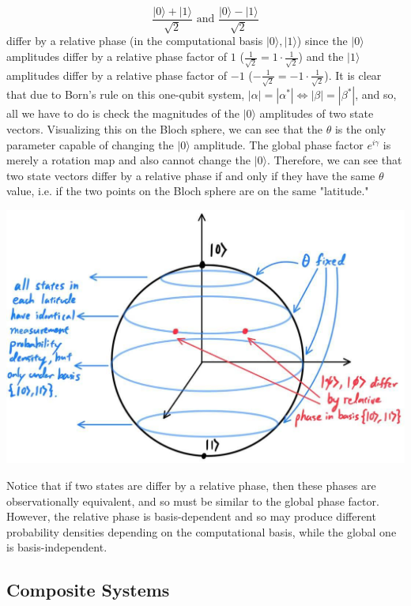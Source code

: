 \documentclass{article}
\begin{document}
    \[\frac{|0\rangle + |1\rangle}{\sqrt{2}} \text{ and } \frac{|0\rangle - |1\rangle}{\sqrt{2}}\]
    differ by a relative phase (in the computational basis $|0\rangle, |1\rangle$) since the $|0\rangle$ amplitudes differ by a relative phase factor of $1$ ($ \frac{1}{\sqrt{2}} = 1 \cdot \frac{1}{\sqrt{2}}$) and the $|1\rangle$ amplitudes differ by a relative phase factor of $-1$ ($-\frac{1}{\sqrt{2}} = -1 \cdot \frac{1}{\sqrt{2}}$). It is clear that due to Born's rule on this one-qubit system, $|\alpha| = |\alpha^*| \iff |\beta| = |\beta^*|$, and so, all we have to do is check the magnitudes of the $|0\rangle$ amplitudes of two state vectors. Visualizing this on the Bloch sphere, we can see that the $\theta$ is the only parameter capable of changing the $|0\rangle$ amplitude. The global phase factor $e^{i\gamma}$ is merely a rotation map and also cannot change the $|0\rangle$. Therefore, we can see that two state vectors differ by a relative phase if and only if they have the same $\theta$ value, i.e. if the two points on the Bloch sphere are on the same "latitude."

    \begin{center} 
      \includegraphics[scale=0.3]{img/Bloch_Sphere_latitude.jpg}
    \end{center}

    Notice that if two states are differ by a relative phase, then these phases are observationally equivalent, and so must be similar to the global phase factor. However, the relative phase is basis-dependent and so may produce different probability densities depending on the computational basis, while the global one is basis-independent. 

  \subsection{Composite Systems}
\end{document}
